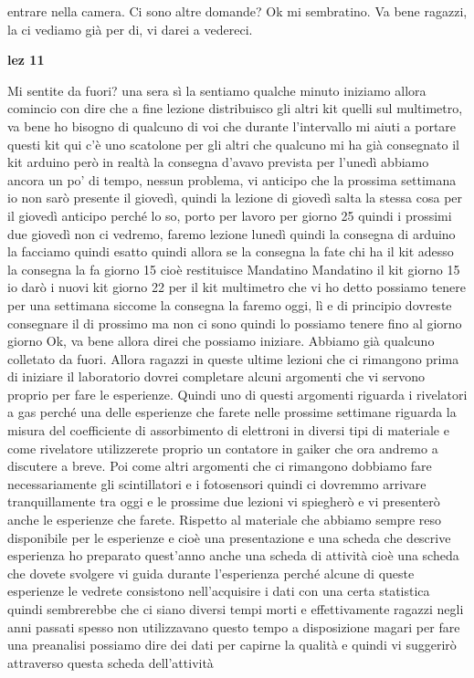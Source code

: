 entrare nella camera. Ci sono altre domande? Ok mi sembratino. Va bene ragazzi, la ci vediamo già per di, vi darei a vedereci.

\textbf{lez 11}

Mi sentite da fuori? una sera sì la sentiamo qualche minuto iniziamo allora comincio con dire che a fine lezione distribuisco gli altri kit quelli sul multimetro, va bene ho bisogno di qualcuno di voi che durante l'intervallo mi aiuti a portare questi kit qui c'è uno scatolone per gli altri che qualcuno mi ha già consegnato il kit arduino però in realtà la consegna d'avavo prevista per l'unedì abbiamo ancora un po' di tempo, nessun problema, vi anticipo che la prossima settimana io non sarò presente il giovedì, quindi la lezione di giovedì salta la stessa cosa per il giovedì anticipo perché lo so, porto per lavoro per giorno 25 quindi i prossimi due giovedì non ci vedremo, faremo lezione lunedì quindi la consegna di arduino la facciamo quindi esatto quindi allora se la consegna la fate chi ha il kit adesso la consegna la fa giorno 15 cioè restituisce Mandatino Mandatino il kit giorno 15 io darò i nuovi kit giorno 22 per il kit multimetro che vi ho detto possiamo tenere per una settimana siccome la consegna la faremo oggi, lì e di principio dovreste consegnare il di prossimo ma non ci sono quindi lo possiamo tenere fino al giorno giorno Ok, va bene allora direi che possiamo iniziare. Abbiamo già qualcuno colletato da fuori. Allora ragazzi in queste ultime lezioni che ci rimangono prima di iniziare il laboratorio dovrei completare alcuni argomenti che vi servono proprio per fare le esperienze. Quindi uno di questi argomenti riguarda i rivelatori a gas perché una delle esperienze che farete nelle prossime settimane riguarda la misura del coefficiente di assorbimento di elettroni in diversi tipi di materiale e come rivelatore utilizzerete proprio un contatore in gaiker che ora andremo a discutere a breve. Poi come altri argomenti che ci rimangono dobbiamo fare necessariamente gli scintillatori e i fotosensori quindi ci dovremmo arrivare tranquillamente tra oggi e le prossime due lezioni vi spiegherò e vi presenterò anche le esperienze che farete. Rispetto al materiale che abbiamo sempre reso disponibile per le esperienze e cioè una presentazione e una scheda che descrive esperienza ho preparato quest'anno anche una scheda di attività cioè una scheda che dovete svolgere vi guida durante l'esperienza perché alcune di queste esperienze le vedrete consistono nell'acquisire i dati con una certa statistica quindi sembrerebbe che ci siano diversi tempi morti e effettivamente ragazzi negli anni passati spesso non utilizzavano questo tempo a disposizione magari per fare una preanalisi possiamo dire dei dati per capirne la qualità e quindi vi suggerirò attraverso questa scheda dell'attività 

